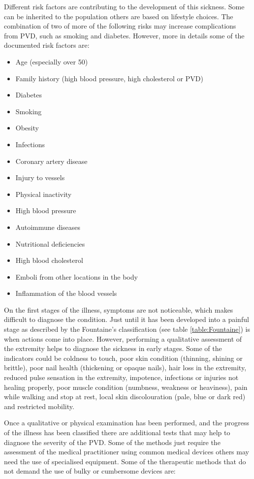 Different risk factors are contributing to the development of this sickness. Some can be inherited to the population others are based on lifestyle choices. The combination of two of more of the following risks may increase complications from PVD, such as smoking and diabetes. However, more in details some of the documented risk factors are:

\begin{itemize}[noitemsep]
    \item Age (especially over \num{50})
    \item Family history (high blood pressure, high cholesterol or PVD)
    \item Diabetes
    \item Smoking
    \item Obesity
    \item Infections
    \item Coronary artery disease
    \item Injury to vessels
    \item Physical inactivity
    \item High blood pressure
    \item Autoimmune diseases
    \item Nutritional deficiencies
    \item High blood cholesterol
    \item Emboli from other locations in the body
    \item Inflammation of the blood vessels
\end{itemize}

On the first stages of the illness, symptoms are not noticeable, which makes difficult to diagnose the condition. Just until it has been developed into a painful stage as described by the Fountaine's classification (see table \ref{table:Fountaine}) is when actions come into place. However, performing a qualitative assessment of the extremity helps to diagnose the sickness in early stages. Some of the indicators could be coldness to touch, poor skin condition (thinning, shining or brittle), poor nail health (thickening or opaque nails), hair loss in the extremity, reduced pulse sensation in the extremity, impotence, infections or injuries not healing properly, poor muscle condition (numbness, weakness or heaviness), pain while walking and stop at rest, local skin discolouration (pale, blue or dark red) and restricted mobility. 

Once a qualitative or physical examination has been performed, and the progress of the illness has been classified there are additional tests that may help to diagnose the severity of the PVD. Some of the methods just require the assessment of the medical practitioner using common medical devices others may need the use of specialised equipment. Some of the therapeutic methods that do not demand the use of bulky or cumbersome devices are:

